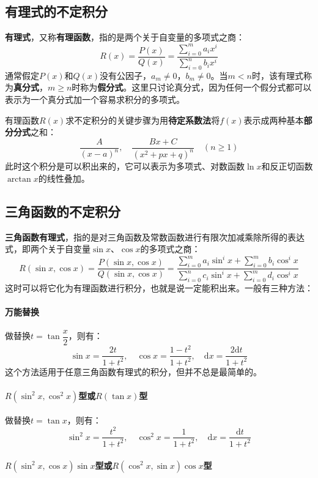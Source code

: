\documentclass[fontset=none,openany,a4paper]{ctexbook}
\begin{document}
\subsection{有理式的不定积分}

\textbf{有理式}，又称\textbf{有理函数}，指的是两个关于自变量的多项式之商：
\[
R(x) = \frac{P(x)}{Q(x)} = \frac{\sum\limits_{i=0}^m a_i x^i}{\sum\limits_{i=0}^n b_i x^i}
\]
通常假定$P(x)$和$Q(x)$没有公因子，$a_m\neq0$，$b_m\neq0$。当$m<n$时，该有理式称为\textbf{真分式}，$m\geqslant n$时称为\textbf{假分式}。这里只讨论真分式，因为任何一个假分式都可以表示为一个真分式加一个容易求积分的多项式。

有理函数$R(x)$求不定积分的关键步骤为用\textbf{待定系数法}将$f(x)$表示成两种基本\textbf{部分分式}之和：
\[
\frac{A}{(x-a)^n},\quad \frac{Bx+C}{(x^2+px+q)^n}\quad (n\geqslant1)
\]
此时这个积分是可以积出来的，它可以表示为多项式、对数函数$\ln x$和反正切函数$\arctan x$的线性叠加。

\subsection{三角函数的不定积分}

\textbf{三角函数有理式}，指的是对三角函数及常数函数进行有限次加减乘除所得的表达式，即两个关于自变量$\sin x$、$\cos x$的多项式之商：
\[
R(\sin x,\cos x) = \frac{P(\sin x,\cos x)}{Q(\sin x,\cos x)} = \frac{\sum\limits_{i=0}^m a_i \sin^i x + \sum\limits_{i=0}^m b_i \cos^i x}{\sum\limits_{i=0}^n c_i \sin^i x + \sum\limits_{i=0}^m d_i \cos^i x}
\]
这时可以将它化为有理函数进行积分，也就是说一定能积出来。一般有三种方法：

\paragraph{万能替换}

做替换$t=\tan\dfrac{x}{2}$，则有：
\[
\sin x = \frac{2t}{1+t^2},\quad \cos x = \frac{1-t^2}{1+t^2},\quad \mathrm{d}x = \frac{2\mathrm{d}t}{1+t^2}
\]
这个方法适用于任意三角函数有理式的积分，但并不总是最简单的。

\paragraph{$R(\sin^2 x,\cos^2 x)$型或$R(\tan x)$型}

做替换$t=\tan x$，则有：
\[
\sin^2 x = \frac{t^2}{1+t^2},\quad \cos^2 x = \frac{1}{1+t^2},\quad \mathrm{d}x = \frac{\mathrm{d}t}{1+t^2}
\]

\paragraph{$R(\sin^2 x,\cos x)\sin x$型或$R(\cos^2 x,\sin x)\cos x$型}
\end{document}
